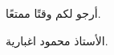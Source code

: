 ﻿\documentclass[14pt]{extarticle}
\begin{document}
\begin{enumerate}[itemsep=3em]



\end{enumerate}


\vspace{1cm}
\begin{flushleft}
أرجو لكم وقتًا ممتعًا.

الأستاذ محمود اغبارية.
\end{flushleft}
\end{document}
